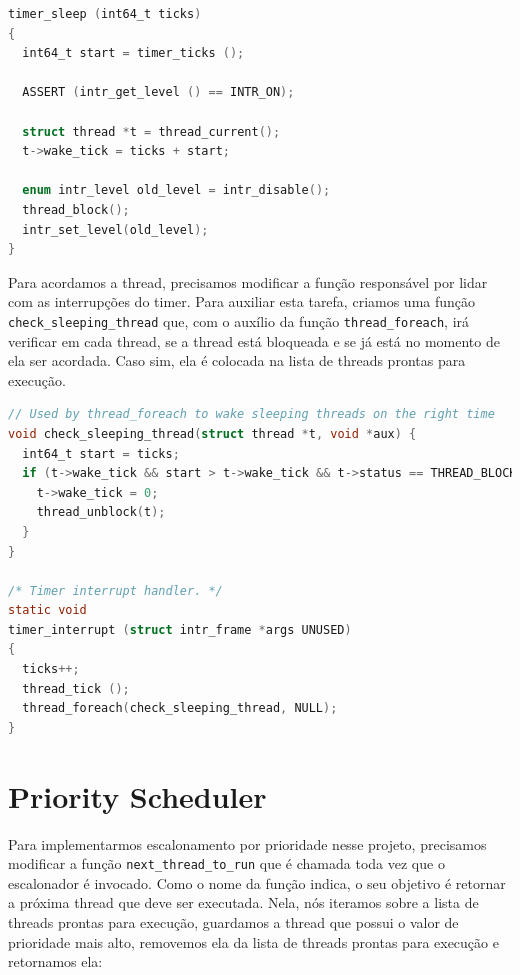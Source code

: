 \documentclass{article}
\begin{document}
\begin{lstlisting}[language=C]
timer_sleep (int64_t ticks) 
{
  int64_t start = timer_ticks ();

  ASSERT (intr_get_level () == INTR_ON);

  struct thread *t = thread_current();
  t->wake_tick = ticks + start;

  enum intr_level old_level = intr_disable();
  thread_block();
  intr_set_level(old_level);
}
\end{lstlisting}


\hfill \break

Para acordamos a thread, precisamos modificar a função responsável por lidar com as interrupções do timer.
Para auxiliar esta tarefa, criamos uma função \texttt{check\_sleeping\_thread} que, com o auxílio da função \texttt{thread\_foreach}, irá verificar em cada thread, se a thread está bloqueada e se já está no momento de ela ser acordada. Caso sim, ela é colocada na lista de threads prontas para execução.


\begin{lstlisting}[language=C]
// Used by thread_foreach to wake sleeping threads on the right time
void check_sleeping_thread(struct thread *t, void *aux) {
  int64_t start = ticks;
  if (t->wake_tick && start > t->wake_tick && t->status == THREAD_BLOCKED) {
    t->wake_tick = 0;
    thread_unblock(t);
  }
}

/* Timer interrupt handler. */
static void
timer_interrupt (struct intr_frame *args UNUSED)
{
  ticks++;
  thread_tick ();
  thread_foreach(check_sleeping_thread, NULL);
}
\end{lstlisting}

\section*{Priority Scheduler}
Para implementarmos escalonamento por prioridade nesse projeto, precisamos modificar a função \texttt{next\_thread\_to\_run} que é chamada toda vez que o escalonador é invocado. Como o nome da função indica, o seu objetivo é retornar a próxima thread que deve ser executada. 
Nela, nós iteramos sobre a lista de threads prontas para execução, guardamos a thread que possui o valor de prioridade mais alto, removemos ela da lista de threads prontas para execução e retornamos ela:
\end{document}
